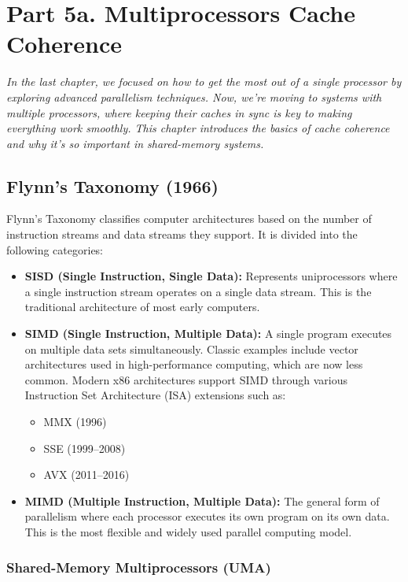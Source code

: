 \chapter{Part 5a. Multiprocessors Cache Coherence}
\textit{In the last chapter, we focused on how to get the most out of a single processor by exploring advanced parallelism techniques. Now, we’re moving to systems with multiple processors, where keeping their caches in sync is key to making everything work smoothly. This chapter introduces the basics of cache coherence and why it’s so important in shared-memory systems.}
\section{Flynn's Taxonomy (1966)}
Flynn's Taxonomy classifies computer architectures based on the number of instruction streams and data streams they support. It is divided into the following categories:
\begin{itemize}
    \item \textbf{SISD (Single Instruction, Single Data):} Represents uniprocessors where a single instruction stream operates on a single data stream. This is the traditional architecture of most early computers.

    \item \textbf{SIMD (Single Instruction, Multiple Data):} A single program executes on multiple data sets simultaneously. Classic examples include vector architectures used in high-performance computing, which are now less common. Modern x86 architectures support SIMD through various Instruction Set Architecture (ISA) extensions such as:
    \begin{itemize}
        \item MMX (1996)
        \item SSE (1999--2008)
        \item AVX (2011--2016)
    \end{itemize}

    \item \textbf{MIMD (Multiple Instruction, Multiple Data):} The general form of parallelism where each processor executes its own program on its own data. This is the most flexible and widely used parallel computing model.
\end{itemize}

\subsection{Shared-Memory Multiprocessors (UMA)}

